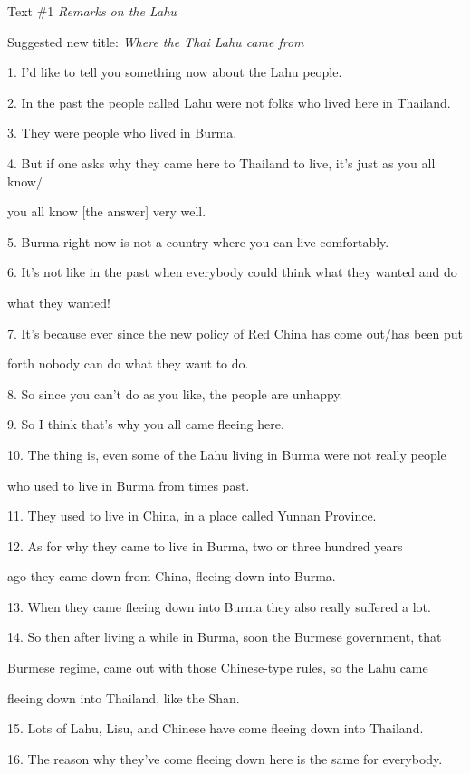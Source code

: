 
{\large{}Text \#1 }{\large{}\textit{Remarks on the Lahu}}

{\large{}Suggested new title:  }{\large{}\textit{Where the Thai Lahu came from}}

1. I'd like to tell you something now about the Lahu people.

2. In the past the people called Lahu were not folks who lived here in Thailand.

3. They were people who lived in Burma.

4. But if one asks why they came here to Thailand to live, it's just as you all
know/

you all know [the answer] very well.

5. Burma right now is not a country where you can live comfortably.

6. It's not like in the past when everybody could think what they wanted and do

what they wanted!

7. It's because ever since the new policy of Red China has come out/has been put

forth nobody can do what they want to do.

8. So since you can't do as you like, the people are unhappy.

9. So I think that's why you all came fleeing here.

10. The thing is, even some of the Lahu living in Burma were not really people

who used to live in Burma from times past.

11. They used to live in China, in a place called Yunnan Province.

12. As for why they came to live in Burma, two or three hundred years

ago they came down from China, fleeing down into Burma.

13. When they came fleeing down into Burma they also really suffered a lot.

14. So then after living a while in Burma, soon the Burmese government, that

Burmese regime, came out with those Chinese-type rules, so the Lahu came

fleeing down into Thailand, like the Shan.

15. Lots of Lahu, Lisu, and Chinese have come fleeing down into Thailand.

16. The reason why they've come fleeing down here is the same for everybody.


